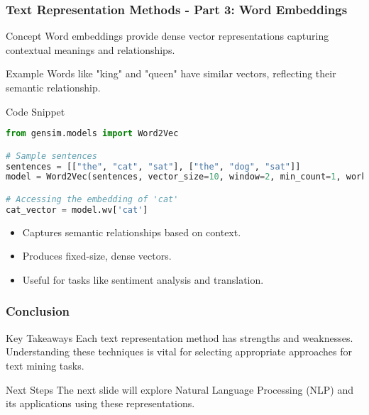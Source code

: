 \documentclass[aspectratio=169]{beamer}
\begin{document}
\begin{frame}[fragile]
    \frametitle{Text Representation Methods - Part 3: Word Embeddings}
    \begin{block}{Concept}
        Word embeddings provide dense vector representations capturing contextual meanings and relationships.
    \end{block}
    
    \begin{block}{Example}
        Words like "king" and "queen" have similar vectors, reflecting their semantic relationship.
    \end{block}

    \begin{block}{Code Snippet}
        \begin{lstlisting}[language=Python]
from gensim.models import Word2Vec

# Sample sentences
sentences = [["the", "cat", "sat"], ["the", "dog", "sat"]]
model = Word2Vec(sentences, vector_size=10, window=2, min_count=1, workers=4)

# Accessing the embedding of 'cat'
cat_vector = model.wv['cat']
        \end{lstlisting}
    \end{block}
    
    \begin{itemize}
        \item Captures semantic relationships based on context.
        \item Produces fixed-size, dense vectors.
        \item Useful for tasks like sentiment analysis and translation.
    \end{itemize}
\end{frame}

\begin{frame}[fragile]
    \frametitle{Conclusion}
    \begin{block}{Key Takeaways}
        Each text representation method has strengths and weaknesses. Understanding these techniques is vital for selecting appropriate approaches for text mining tasks.
    \end{block}
    \begin{block}{Next Steps}
        The next slide will explore Natural Language Processing (NLP) and its applications using these representations.
    \end{block}
\end{frame}
\end{document}
